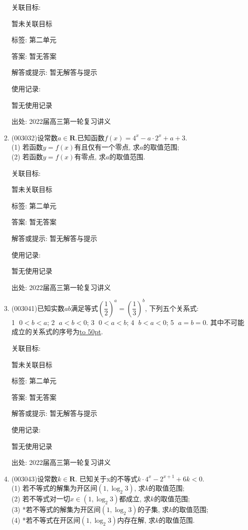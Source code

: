 \documentclass[10pt,a4paper]{article}
\newcommand{\blank}[1]{\underline{\hbox to #1pt{}}}
\begin{document}
\begin{enumerate}[1.]
关联目标:

暂未关联目标



标签: 第二单元

答案: 暂无答案

解答或提示: 暂无解答与提示

使用记录:

暂无使用记录


出处: 2022届高三第一轮复习讲义
\item { (003032)}设常数$a\in \mathbf{R}$.已知函数$f(x)=4^x-a\cdot 2^x+a+3$.\\
(1) 若函数$y=f(x)$有且仅有一个零点, 求$a$的取值范围;\\
(2) 若函数$y=f(x)$有零点, 求$a$的取值范围.


关联目标:

暂未关联目标



标签: 第二单元

答案: 暂无答案

解答或提示: 暂无解答与提示

使用记录:

暂无使用记录


出处: 2022届高三第一轮复习讲义
\item { (003041)}已知实数$ab$满足等式$(\dfrac 12)^a=(\dfrac 13)^b$, 下列五个关系式:\\
\textcircled{1} $0<b<a$; \textcircled{2} $a<b<0$; \textcircled{3} $0<a<b$; \textcircled{4} $b<a<0$; \textcircled{5} $a=b=0$. 其中不可能成立的关系式的序号为\blank{50}.


关联目标:

暂未关联目标



标签: 第二单元

答案: 暂无答案

解答或提示: 暂无解答与提示

使用记录:

暂无使用记录


出处: 2022届高三第一轮复习讲义
\item { (003043)}设常数$k\in \mathbf{R}$. 已知关于x的不等式$k\cdot 4^x-2^{x+1}+6k<0$.\\
(1) 若不等式的解集为开区间$(1, \log_2 3)$, 求$k$的取值范围;\\
(2) 若不等式对一切$x\in (1,\log_2 3)$都成立, 求$k$的取值范围;\\
(3) *若不等式的解集为开区间$(1,\log_2 3)$的子集, 求$k$的取值范围;\\
(4) *若不等式在开区间$(1,\log_2 3)$内存在解, 求$k$的取值范围.



\end{enumerate}
\end{document}
